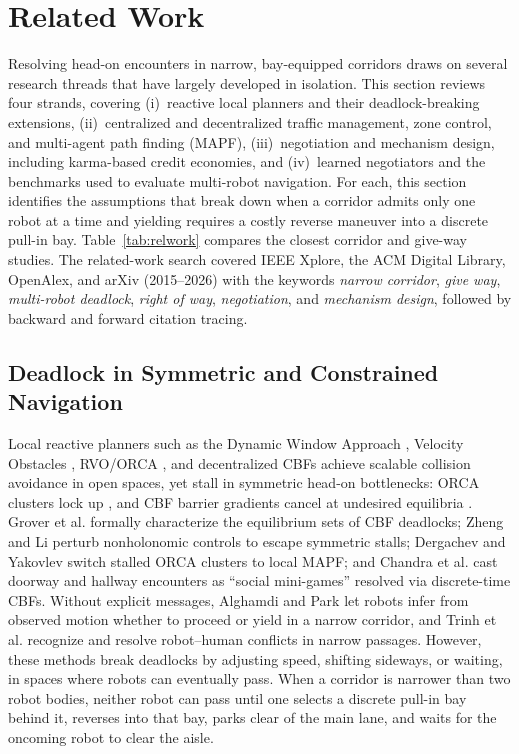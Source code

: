 \section{Related Work}\label{sec:rel}
\vspace{-0.2cm}
Resolving head-on encounters in narrow, bay-equipped corridors draws on several research threads that have largely developed in isolation. This section reviews four strands, covering (i)~reactive local planners and their deadlock-breaking extensions, (ii)~centralized and decentralized traffic management, zone control, and multi-agent path finding (MAPF), (iii)~negotiation and mechanism design, including karma-based credit economies, and (iv)~learned negotiators and the benchmarks used to evaluate multi-robot navigation. For each, this section identifies the assumptions that break down when a corridor admits only one robot at a time and yielding requires a costly reverse maneuver into a discrete pull-in bay. Table~\ref{tab:relwork} compares the closest corridor and give-way studies. The related-work search covered IEEE Xplore, the ACM Digital Library, OpenAlex, and arXiv (2015--2026) with the keywords \emph{narrow corridor}, \emph{give way}, \emph{multi-robot deadlock}, \emph{right of way}, \emph{negotiation}, and \emph{mechanism design}, followed by backward and forward citation tracing.

\subsection{Deadlock in Symmetric and Constrained Navigation}
Local reactive planners such as the Dynamic Window Approach \cite{fox1997dwa}, Velocity Obstacles \cite{fiorini1998motion}, RVO/ORCA \cite{vandenberg2011orca}, and decentralized CBFs \cite{wang2017safety} achieve scalable collision avoidance in open spaces, yet stall in symmetric head-on bottlenecks: ORCA clusters lock up \cite{dergachev2021distributed}, and CBF barrier gradients cancel at undesired equilibria \cite{grover2023before}. Grover et al. \cite{grover2023before} formally characterize the equilibrium sets of CBF deadlocks; Zheng and Li \cite{zheng2023deadlock} perturb nonholonomic controls to escape symmetric stalls; Dergachev and Yakovlev \cite{dergachev2021distributed} switch stalled ORCA clusters to local MAPF; and Chandra et al. \cite{chandra2025deadlock,chandra2026social} cast doorway and hallway encounters as ``social mini-games'' resolved via discrete-time CBFs. Without explicit messages, Alghamdi and Park \cite{alghamdi2025opinion} let robots infer from observed motion whether to proceed or yield in a narrow corridor, and Trinh et al. \cite{trinh2015goahead} recognize and resolve robot--human conflicts in narrow passages. However, these methods break deadlocks by adjusting speed, shifting sideways, or waiting, in spaces where robots can eventually pass. When a corridor is narrower than two robot bodies, neither robot can pass until one selects a discrete pull-in bay behind it, reverses into that bay, parks clear of the main lane, and waits for the oncoming robot to clear the aisle.

